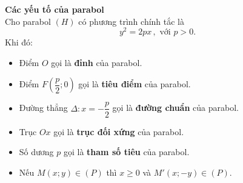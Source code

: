 \begin{nx}
	{\bf Các yếu tố của parabol}\\
	Cho parabol $(H)$ có phương trình chính tắc là $$y^2=2px \,, \text{ với } p>0.$$
Khi đó:
\begin{itemize}
	\item Điểm $O$ gọi là \textbf{đỉnh} của parabol.
	\item Điểm $F\left(\dfrac{p}{2};0\right)$ gọi là \textbf{tiêu điểm} của parabol.
	\item Đường thẳng $\Delta\colon x=-\dfrac{p}{2}$ gọi là \textbf{đường chuẩn} của parabol.
	\item Trục $Ox$ gọi là \textbf{trục đối xứng} của parabol.
	\item Số dương $p$ gọi là \textbf{tham số tiêu} của parabol.
	\item Nếu $M(x;y)\in (P)$ thì $x\ge 0$ và $M'(x;-y)\in (P)$.
\end{itemize}
\end{nx}
